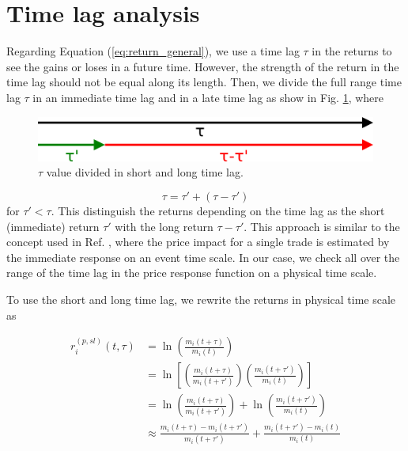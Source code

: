 \section{Time lag analysis}\label{sec:short_long}

Regarding Equation (\ref{eq:return_general}), we use a time lag $\tau$ in the
returns to see the gains or loses in a future time. However, the strength of
the return in the time lag should not be equal along its length. Then, we
divide the full range time lag $\tau$ in an immediate time lag and in a late
time lag as show in Fig. \ref{fig:tau_short_long}, where

\begin{figure}[htbp]
    \centering
    \includegraphics[width=\columnwidth]{figures/05_tau_short_long.png}
    \caption{$\tau$ value divided in short and long time lag.}
    \label{fig:tau_short_long}
\end{figure}

\begin{equation}\label{eq:tau_short_long}
    \tau = \tau' + \left( \tau - \tau' \right)
\end{equation}
for $\tau' < \tau$. This distinguish the returns depending on the time lag as
the short (immediate) return $\tau'$ with the long return $\tau - \tau'$.
This approach is similar to the concept used in Ref. \cite{Wang_2018_b}, where
the price impact for a single trade is estimated by the immediate response on
an event time scale. In our case, we check all over the range of the time lag
in the price response function on a physical time scale.

To use the short and long time lag, we rewrite the returns in physical time
scale as

\begin{align}\label{eq:short_long_return}
    r^{\left(p, sl\right)}_{i}\left(t,\tau\right)&=\ln\left(\frac{m_{i}\left(t+\tau\right)}
    {m_{i} \left(t\right)}\right) \nonumber \\
    &=\ln\left[\left(\frac{m_{i}\left(t+\tau\right)}{m_{i}\left(t+\tau'\right)}
    \right)
    \left(\frac{m_{i} \left(t+\tau'\right)}{m_{i}\left(t\right)}\right)\right]
    \nonumber \\
    &=\ln\left(\frac{m_{i}\left(t+\tau\right)}{m_{i}\left(t+\tau'\right)}
    \right)+ \ln\left(\frac{m_{i}\left(t+\tau'\right)}{m_{i}\left(t\right)}
    \right)\nonumber \\
    &\approx\frac{m_{i}\left(t+\tau\right)-m_{i}\left(t+\tau'\right)}
    {m_{i}\left(t+\tau'\right)} +\frac{m_{i}\left(t+\tau'\right)-m_{i}
    \left(t\right)}{m_{i}\left(t\right)}
\end{align}

